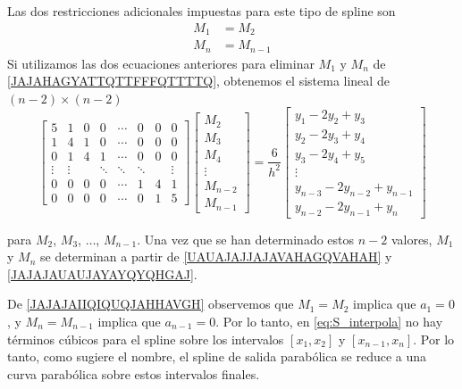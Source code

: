 Las dos restricciones adicionales impuestas para este tipo de spline son
\begin{align}
    M_1 & = M_2 \label{UAUAJAJJAJAVAHAGQVAHAH} \\
    M_n & = M_{n-1} \label{JAJAJAUAUJAYAYQYQHGAJ}
\end{align}
Si utilizamos las dos ecuaciones anteriores para eliminar $M_1$ y $M_n$ de \eqref{JAJAHAGYATTQTTFFFQTTTTQ}, obtenemos el sistema lineal de $(n - 2) \times (n - 2)$
$$\begin{bmatrix}
    5 & 1 & 0 & 0 & \cdots & 0 & 0 & 0 \\
    1 & 4 & 1 & 0 & \cdots & 0 & 0 & 0 \\
    0 & 1 & 4 & 1 & \cdots & 0 & 0 & 0 \\
    \vdots & \vdots & & \ddots & \ddots & \ddots & & \vdots \\
    0 & 0 & 0 & 0 & \cdots & 1 & 4 & 1 \\
    0 & 0 & 0 & 0 & \cdots & 0 & 1 & 5
\end{bmatrix} \begin{bmatrix}
    M_2 \\
    M_3 \\
    M_4 \\
    \vdots \\
    M_{n-2} \\
    M_{n-1}
\end{bmatrix} = \frac{6}{h^2} \begin{bmatrix}
    y_1 - 2y_2 + y_3 \\
    y_2 - 2y_3 + y_4 \\
    y_3 - 2y_4 + y_5 \\
    \vdots \\
    y_{n-3} - 2y_{n-2} + y_{n-1} \\
    y_{n-2} - 2y_{n-1} + y_n
\end{bmatrix}$$\newpage\noindent

para $M_2$, $M_3$, $\dots$, $M_{n-1}$. Una vez que se han determinado estos $n - 2$ valores, $M_1$ y $M_n$ se determinan a partir de \eqref{UAUAJAJJAJAVAHAGQVAHAH} y \eqref{JAJAJAUAUJAYAYQYQHGAJ}.

De \eqref{JAJAJAIIQIQUQJAHHAVGH} observemos que $M_1 = M_2$ implica que $a_1 = 0$, y $M_n = M_{n-1}$ implica que $a_{n-1} = 0$. Por lo tanto, en \eqref{eq:S_interpola} no hay términos cúbicos para el spline sobre los intervalos $[x_1, x_2]$ y $[x_{n-1}, x_n]$. Por lo tanto, como sugiere el nombre, el spline de salida parabólica se reduce a una curva parabólica sobre estos intervalos finales.

